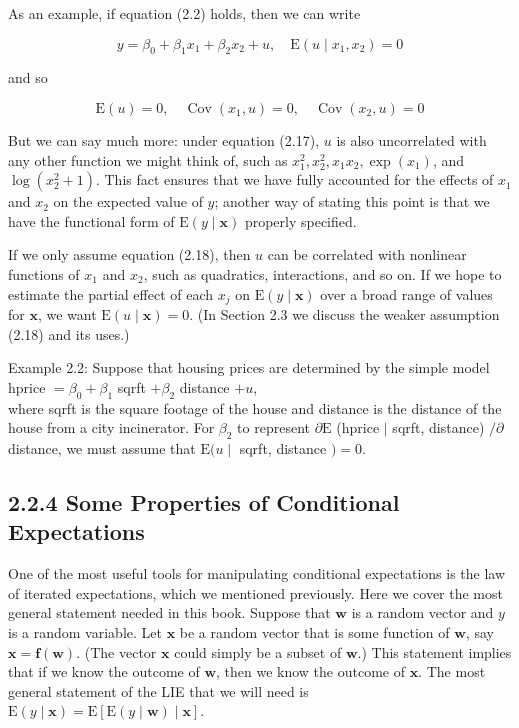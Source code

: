 \documentclass[10pt]{article}
\begin{document}
As an example, if equation (2.2) holds, then we can write


\begin{equation*}
y=\beta_{0}+\beta_{1} x_{1}+\beta_{2} x_{2}+u, \quad \mathrm{E}\left(u \mid x_{1}, x_{2}\right)=0 \tag{2.17}
\end{equation*}


and so


\begin{equation*}
\mathrm{E}(u)=0, \quad \operatorname{Cov}\left(x_{1}, u\right)=0, \quad \operatorname{Cov}\left(x_{2}, u\right)=0 \tag{2.18}
\end{equation*}


But we can say much more: under equation (2.17), $u$ is also uncorrelated with any other function we might think of, such as $x_{1}^{2}, x_{2}^{2}, x_{1} x_{2}, \exp \left(x_{1}\right)$, and $\log \left(x_{2}^{2}+1\right)$. This fact ensures that we have fully accounted for the effects of $x_{1}$ and $x_{2}$ on the expected value of $y$; another way of stating this point is that we have the functional form of $\mathrm{E}(y \mid \mathbf{x})$ properly specified.

If we only assume equation (2.18), then $u$ can be correlated with nonlinear functions of $x_{1}$ and $x_{2}$, such as quadratics, interactions, and so on. If we hope to estimate the partial effect of each $x_{j}$ on $\mathrm{E}(y \mid \mathbf{x})$ over a broad range of values for $\mathbf{x}$, we want $\mathrm{E}(u \mid \mathbf{x})=0$. (In Section 2.3 we discuss the weaker assumption (2.18) and its uses.)

Example 2.2: Suppose that housing prices are determined by the simple model\\
hprice $=\beta_{0}+\beta_{1}$ sqrft $+\beta_{2}$ distance $+u$,\\
where sqrft is the square footage of the house and distance is the distance of the house from a city incinerator. For $\beta_{2}$ to represent $\partial \mathrm{E}$ (hprice $\mid$ sqrft, distance) $/ \partial$ distance, we must assume that $\mathrm{E}(u \mid$ sqrft, distance $)=0$.

\subsection*{2.2.4 Some Properties of Conditional Expectations}
One of the most useful tools for manipulating conditional expectations is the law of iterated expectations, which we mentioned previously. Here we cover the most general statement needed in this book. Suppose that $\mathbf{w}$ is a random vector and $y$ is a random variable. Let $\mathbf{x}$ be a random vector that is some function of $\mathbf{w}$, say $\mathbf{x}=\mathbf{f}(\mathbf{w})$. (The vector $\mathbf{x}$ could simply be a subset of $\mathbf{w}$.) This statement implies that if we know the outcome of $\mathbf{w}$, then we know the outcome of $\mathbf{x}$. The most general statement of the LIE that we will need is\\
$\mathrm{E}(y \mid \mathbf{x})=\mathrm{E}[\mathrm{E}(y \mid \mathbf{w}) \mid \mathbf{x}]$.
\end{document}
